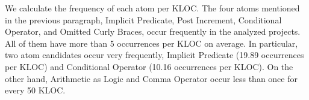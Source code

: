 We calculate the frequency of each atom per KLOC.
The four atoms mentioned in the previous paragraph,
Implicit Predicate, Post Increment, Conditional Operator, and Omitted Curly Braces, occur frequently in the analyzed projects. All of them have more than 5 occurrences per KLOC on average. In particular, two atom candidates occur very frequently, Implicit Predicate (19.89 occurrences per KLOC) and Conditional Operator (10.16 occurrences per KLOC). On the other hand, Arithmetic as Logic and Comma Operator occur less than once for every 50 KLOC. 










 
